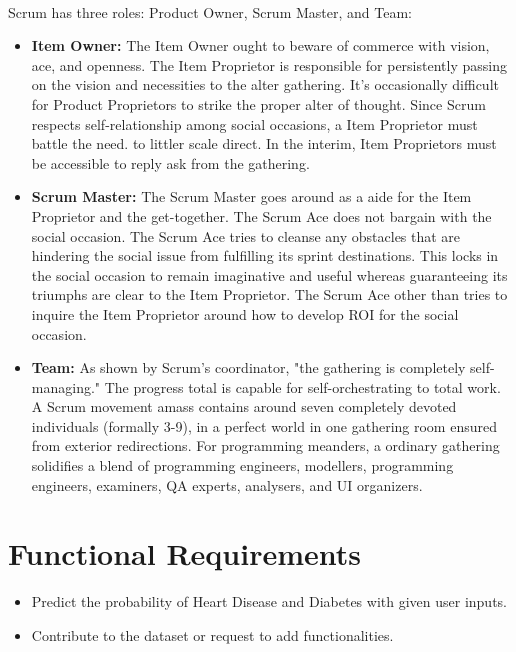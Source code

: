 \documentclass{book}
\begin{document}
		\paragraph{}
    	Scrum has three roles: Product Owner, Scrum Master, and Team:
    	\begin{itemize}
    		\item \textbf{Item Owner:} The Item Owner ought to beware of commerce with vision, ace, and openness. The Item Proprietor is responsible for persistently passing on the vision and necessities to the alter gathering. It's occasionally difficult for Product Proprietors to strike the proper alter of thought. Since Scrum respects self-relationship among social occasions, a Item Proprietor must battle the need. to littler scale direct. In the interim, Item Proprietors must be accessible to reply ask from the gathering.
    		
    		\item \textbf{Scrum Master:} The Scrum Master goes around as a aide for the Item Proprietor and the get-together. The Scrum Ace does not bargain with the social occasion. The Scrum Ace tries to cleanse any obstacles that are hindering the social issue from fulfilling its sprint destinations. This locks in the social occasion to remain imaginative and useful whereas guaranteeing its triumphs are clear to the Item Proprietor. The Scrum Ace other than tries to inquire the Item Proprietor around how to develop ROI for the social occasion.
    		
    		\item \textbf{Team:} As shown by Scrum's coordinator, "the gathering is completely self-managing." The progress total is capable for self-orchestrating to total work. A Scrum movement amass contains around seven completely devoted individuals (formally 3-9), in a perfect world in one gathering room ensured from exterior redirections. For programming meanders, a ordinary gathering solidifies a blend of programming engineers, modellers, programming engineers, examiners, QA experts, analysers, and UI organizers.
    	\end{itemize}
    	
    	
    	\section{Functional Requirements}
    	\begin{itemize}
    		\item Predict the probability of Heart Disease and Diabetes with given user inputs.
    		\item Contribute to the dataset or request to add functionalities.
    	\end{itemize}
    
\end{document}
